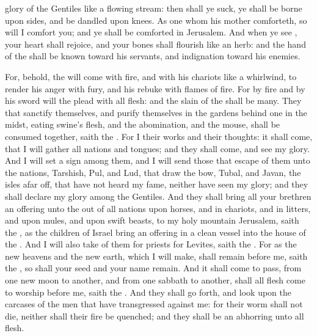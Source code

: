{glory of the
Gentiles like a
flowing
stream: then shall ye
suck, ye shall be
borne upon
{}
sides, and be
dandled upon
{}
knees.
As
one whom his
mother
comforteth, so will I
comfort you; and ye shall be
comforted in
Jerusalem.
And when ye
see
{}, your
heart shall
rejoice, and your
bones shall
flourish like an
herb: and the
hand of the
{} shall be
known toward his
servants, and
{}
indignation toward his
enemies.
\par }{\PP {}For, behold, the
{} will
come with
fire, and with his
chariots like a
whirlwind, to
render his
anger with
fury, and his
rebuke with
flames of
fire.
For by
fire and by his
sword will the
{}
plead with all
flesh: and the
slain of the
{} shall be
many.
They that
sanctify themselves, and
purify themselves in the
gardens
behind
one
{} in the
midst,
eating
swine’s
flesh, and the
abomination, and the
mouse, shall be
consumed
together,
saith the
{}.
For I
{} their
works and their
thoughts: it shall
come, that I will
gather all
nations and
tongues; and they shall
come, and
see my
glory.
And I will
set a
sign among them, and I will
send those that
escape of them unto the
nations,
{}
Tarshish,
Pul, and
Lud, that
draw the
bow,
{}
Tubal, and
Javan,
{} the
isles afar
off, that have not
heard my
fame, neither have
seen my
glory; and they shall
declare my
glory among the
Gentiles.
And they shall
bring all your
brethren
{} an
offering unto the
{} out of all
nations upon
horses, and in
chariots, and in
litters, and upon
mules, and upon swift
beasts, to my
holy
mountain
Jerusalem,
saith the
{}, as the
children of
Israel
bring an
offering in a
clean
vessel into the
house of the
{}.
And I will also
take of them for
priests
{} for
Levites,
saith the
{}.
For as the
new
heavens and the
new
earth, which I will
make, shall
remain
before me,
saith the
{}, so shall your
seed and your
name
remain.
And it shall come to pass,
{}
from one new
moon to
another, and
from one
sabbath to
another, shall all
flesh
come to
worship
before me,
saith the
{}.
And they shall go
forth, and
look upon the
carcases of the
men that have
transgressed against me: for their
worm shall not
die, neither shall their
fire be
quenched; and they shall be an
abhorring unto all
flesh.
\par }
